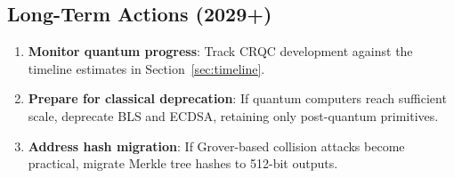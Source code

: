 \subsection{Long-Term Actions (2029+)}

\begin{enumerate}[leftmargin=2em]
  \item \textbf{Monitor quantum progress}: Track CRQC development against the
        timeline estimates in Section~\ref{sec:timeline}.
  \item \textbf{Prepare for classical deprecation}: If quantum computers reach
        sufficient scale, deprecate BLS and ECDSA, retaining only post-quantum
        primitives.
  \item \textbf{Address hash migration}: If Grover-based collision attacks become
        practical, migrate Merkle tree hashes to 512-bit outputs.
\end{enumerate}

